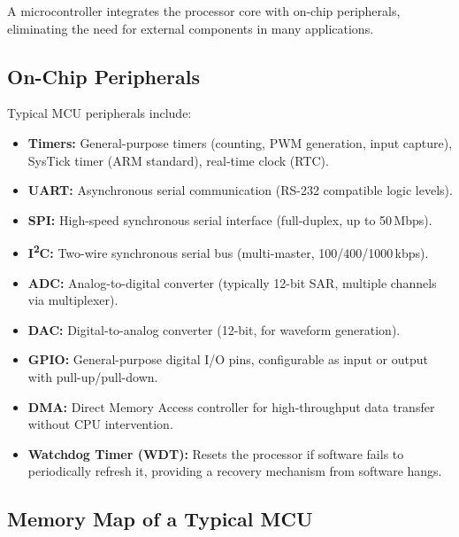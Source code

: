 A microcontroller integrates the processor core with on-chip peripherals, eliminating the need for external components in many applications.

\subsection{On-Chip Peripherals}

Typical MCU peripherals include:
\begin{itemize}
  \item \textbf{Timers:} General-purpose timers (counting, PWM generation, input capture), SysTick timer (ARM standard), real-time clock (RTC).
  \item \textbf{UART:} Asynchronous serial communication (RS-232 compatible logic levels).
  \item \textbf{SPI:} High-speed synchronous serial interface (full-duplex, up to 50\,Mbps).
  \item \textbf{I\textsuperscript{2}C:} Two-wire synchronous serial bus (multi-master, 100/400/1000\,kbps).
  \item \textbf{ADC:} Analog-to-digital converter (typically 12-bit SAR, multiple channels via multiplexer).
  \item \textbf{DAC:} Digital-to-analog converter (12-bit, for waveform generation).
  \item \textbf{GPIO:} General-purpose digital I/O pins, configurable as input or output with pull-up/pull-down.
  \item \textbf{DMA:} Direct Memory Access controller for high-throughput data transfer without CPU intervention.
  \item \textbf{Watchdog Timer (WDT):} Resets the processor if software fails to periodically refresh it, providing a recovery mechanism from software hangs.
\end{itemize}

\subsection{Memory Map of a Typical MCU}


